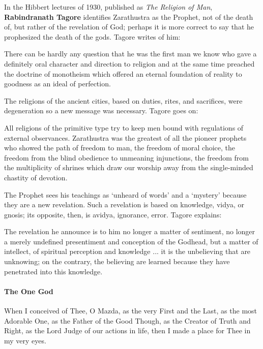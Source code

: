 In the Hibbert lectures of 1930, published as \textit{The Religion of Man}, \textbf{Rabindranath Tagore} identifies Zarathustra as the Prophet, not of the death of, but rather of the revelation of God; perhaps it is more correct to say that he prophesized the death of the gods. Tagore writes of him:

\begin{quotex}
There can be hardly any question that he was the first man we know who gave a definitely oral character and direction to religion and at the same time preached the doctrine of monotheism which offered an eternal foundation of reality to goodness as an ideal of perfection.
\end{quotex}


The religions of the ancient cities, based on duties, rites, and sacrifices, were degeneration so a new message was necessary. Tagore goes on:

\begin{quotex}
All religions of the primitive type try to keep men bound with regulations of external observances. Zarathustra was the greatest of all the pioneer prophets who showed the path of freedom to man, the freedom of moral choice, the freedom from the blind obedience to unmeaning injunctions, the freedom from the multiplicity of shrines which draw our worship away from the single-minded chastity of devotion.
\end{quotex}


The Prophet sees his teachings as `unheard of words' and a `mystery' because they are a new revelation. Such a revelation is based on knowledge, vidya, or gnosis; its opposite, then, is avidya, ignorance, error. Tagore explains:

\begin{quotex}
The revelation he announce is to him no longer a matter of sentiment, no longer a merely undefined presentiment and conception of the Godhead, but a matter of intellect, of spiritual perception and knowledge ... it is the unbelieving that are unknowing; on the contrary, the believing are learned because they have penetrated into this knowledge.
\end{quotex}


\paragraph{The One God}


\begin{quotex}
When I conceived of Thee, O Mazda, as the very First and the Last, as the most Adorable One, as the Father of the Good Though, as the Creator of Truth and Right, as the Lord Judge of our actions in life, then I made a place for Thee in my very eyes.
\end{quotex}


